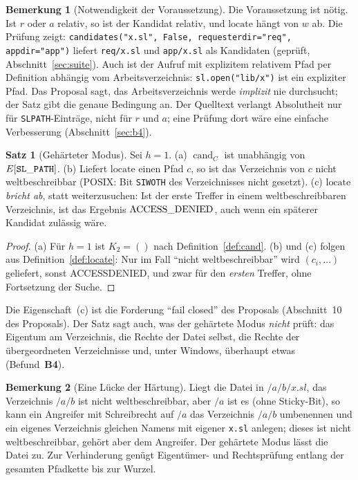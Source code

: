 \documentclass[a4paper,12pt,twoside]{report}
\DeclareRobustCommand{\_}{\ifmmode\mbox{\textunderscore}\else\textunderscore\allowbreak{}\fi}
\theoremstyle{definition}
\newtheorem{satz}{Satz}[chapter]
\newtheorem{bemerkung}{Bemerkung}[chapter]
\newcommand{\Bf}[1]{\textbf{B#1}}
\newcommand{\cand}{\operatorname{cand}}
\begin{document}
\begin{bemerkung}[Notwendigkeit der Voraussetzung]
	Die Voraussetzung ist nötig. Ist $r$ oder $a$ relativ, so ist der Kandidat relativ, und $\mathrm{locate}$ hängt von $w$ ab. Die Prüfung zeigt: \texttt{candidates("x.sl", False, requester\_dir="req", app\_dir="app")} liefert \texttt{req/x.sl} und \texttt{app/x.sl} als Kandidaten (geprüft, Abschnitt~\ref{sec:suite}). Auch ist der Aufruf mit explizitem relativem Pfad per Definition abhängig vom Arbeitsverzeichnis: \texttt{sl.open("lib/x")} ist ein expliziter Pfad. Das Proposal sagt, das Arbeitsverzeichnis werde \emph{implizit} nie durchsucht; der Satz gibt die genaue Bedingung an. Der Quelltext verlangt Absolutheit nur für \texttt{SL\_PATH}-Einträge, nicht für $r$ und $a$; eine Prüfung dort wäre eine einfache Verbesserung (Abschnitt~\ref{sec:b4}).
\end{bemerkung}

\begin{satz}[Gehärteter Modus]
	\label{satz:hardened}
	Sei $h=1$. (a) $\cand_C$ ist unabhängig von $E[\mathtt{SL\_PATH}]$. (b) Liefert $\mathrm{locate}$ einen Pfad $c$, so ist das Verzeichnis von $c$ nicht weltbeschreibbar (POSIX: Bit \texttt{S\_IWOTH} des Verzeichnisses nicht gesetzt). (c) $\mathrm{locate}$ \emph{bricht ab}, statt weiterzusuchen: Ist der erste Treffer in einem weltbeschreibbaren Verzeichnis, ist das Ergebnis $\mathrm{ACCESS\_DENIED}$, auch wenn ein späterer Kandidat zulässig wäre.
\end{satz}

\begin{proof}
	(a) Für $h=1$ ist $K_2=()$ nach Definition~\ref{def:cand}. (b) und (c) folgen aus Definition~\ref{def:locate}: Nur im Fall ``nicht weltbeschreibbar'' wird $(c_i,\ldots)$ geliefert, sonst ACCESS\_DENIED, und zwar für den \emph{ersten} Treffer, ohne Fortsetzung der Suche.
\end{proof}

Die Eigenschaft~(c) ist die Forderung ``fail closed'' des Proposals (Abschnitt~10 des Proposals). Der Satz sagt auch, was der gehärtete Modus \emph{nicht} prüft: das Eigentum am Verzeichnis, die Rechte der Datei selbst, die Rechte der übergeordneten Verzeichnisse und, unter Windows, überhaupt etwas (Befund~\Bf{4}).

\begin{bemerkung}[Eine Lücke der Härtung]
	\label{bem:haertung}
	Liegt die Datei in $/a/b/x.sl$, das Verzeichnis $/a/b$ ist nicht weltbeschreibbar, aber $/a$ ist es (ohne Sticky-Bit), so kann ein Angreifer mit Schreibrecht auf $/a$ das Verzeichnis $/a/b$ umbenennen und ein eigenes Verzeichnis gleichen Namens mit eigener \texttt{x.sl} anlegen; dieses ist nicht weltbeschreibbar, gehört aber dem Angreifer. Der gehärtete Modus lässt die Datei zu. Zur Verhinderung genügt Eigentümer- und Rechtsprüfung entlang der gesamten Pfadkette bis zur Wurzel.
\end{bemerkung}
\end{document}
